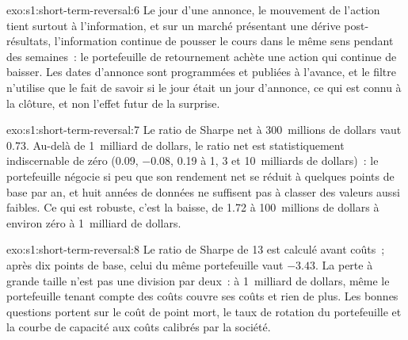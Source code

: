 \begin{solution}{exo:s1:short-term-reversal:6}
Le jour d'une annonce, le mouvement de l'action tient surtout à l'information, et sur un marché présentant une dérive post-résultats, l'information continue de pousser le cours dans le même sens pendant des semaines~: le
portefeuille de retournement achète une action qui continue de baisser. Les dates d'annonce sont programmées et publiées à l'avance, et le filtre n'utilise que le fait de savoir si le jour était un
jour d'annonce, ce qui est connu à la clôture, et non l'effet futur de la surprise.
\end{solution}

\begin{solution}{exo:s1:short-term-reversal:7}
Le ratio de Sharpe net à 300~millions de dollars vaut 0.73. Au-delà de 1~milliard de dollars, le ratio net est statistiquement indiscernable de zéro (0.09, $-0.08$, 0.19 à 1, 3 et 10~milliards de dollars)~:
le portefeuille négocie si peu que son rendement net se réduit à quelques points de base par an, et huit années de données ne suffisent pas à classer des valeurs aussi faibles. Ce qui est robuste, c'est la
baisse, de 1.72 à 100~millions de dollars à environ zéro à 1~milliard de dollars.
\end{solution}

\begin{solution}{exo:s1:short-term-reversal:8}
Le ratio de Sharpe de 13 est calculé avant coûts~; après dix points de base, celui du même portefeuille vaut $-3.43$. La perte à grande taille n'est pas une division par deux~: à 1~milliard de dollars, même le
portefeuille tenant compte des coûts couvre ses coûts et rien de plus. Les bonnes questions portent sur le coût de point mort, le taux de rotation du portefeuille et la courbe de capacité aux
coûts calibrés par la société.
\end{solution}

